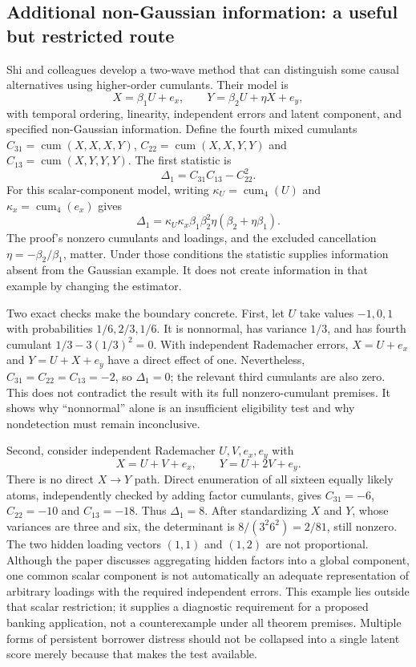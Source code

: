 \subsection{Additional non-Gaussian information: a useful but restricted route}

Shi and colleagues develop a two-wave method that can distinguish some
causal alternatives using higher-order cumulants. Their model is
\[
 X=\beta_1U+e_x,\qquad Y=\beta_2U+\eta X+e_y,
\]
with temporal ordering, linearity, independent errors and latent component,
and specified non-Gaussian information. Define the fourth mixed cumulants
$C_{31}=\operatorname{cum}(X,X,X,Y)$,
$C_{22}=\operatorname{cum}(X,X,Y,Y)$ and
$C_{13}=\operatorname{cum}(X,Y,Y,Y)$. The first statistic is
\[
 \Delta_1=C_{31}C_{13}-C_{22}^2.
\]
For this scalar-component model, writing
$\kappa_U=\operatorname{cum}_4(U)$ and
$\kappa_x=\operatorname{cum}_4(e_x)$ gives
\[
 \Delta_1=\kappa_U\kappa_x\beta_1\beta_2^2
                 \eta(\beta_2+\eta\beta_1).
\]
The proof's nonzero cumulants and loadings, and the excluded cancellation
$\eta=-\beta_2/\beta_1$, matter. Under those conditions the statistic supplies
information absent from the Gaussian example. It does not create information
in that example by changing the estimator.
\citep{exec15_latent_shi,exec15_latent_exact}

Two exact checks make the boundary concrete. First, let $U$ take values
$-1,0,1$ with probabilities $1/6,2/3,1/6$. It is nonnormal, has variance
$1/3$, and has fourth cumulant $1/3-3(1/3)^2=0$. With independent
Rademacher errors, $X=U+e_x$ and $Y=U+X+e_y$ have a direct effect of one.
Nevertheless, $C_{31}=C_{22}=C_{13}=-2$, so $\Delta_1=0$; the relevant
third cumulants are also zero. This does not contradict the result with its
full nonzero-cumulant premises. It shows why ``nonnormal'' alone is an
insufficient eligibility test and why nondetection must remain inconclusive.
\citep{exec15_latent_exact}

Second, consider independent Rademacher $U,V,e_x,e_y$ with
\[
 X=U+V+e_x,\qquad Y=U+2V+e_y.
\]
There is no direct $X\to Y$ path. Direct enumeration of all sixteen equally
likely atoms, independently checked by adding factor cumulants, gives
$C_{31}=-6$, $C_{22}=-10$ and $C_{13}=-18$. Thus $\Delta_1=8$.
After standardizing $X$ and $Y$, whose variances are three and six,
the determinant is $8/(3^2 6^2)=2/81$, still nonzero. The two hidden
loading vectors $(1,1)$ and $(1,2)$ are not proportional. Although the
paper discusses aggregating hidden factors into a global component, one
common scalar component is not automatically an adequate representation of
arbitrary loadings with the required independent errors. This example lies
outside that scalar restriction; it supplies a diagnostic requirement for a
proposed banking application, not a counterexample under all theorem
premises. Multiple forms of persistent borrower distress should not be
collapsed into a single latent score merely because that makes the test
available.
\citep{exec15_latent_shi,exec15_latent_exact}

